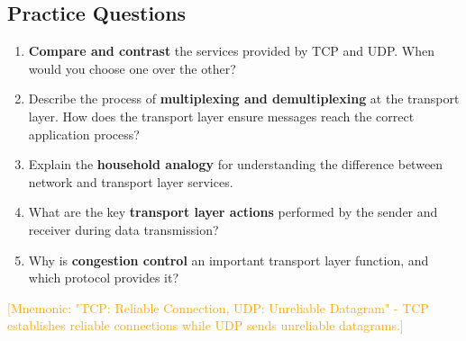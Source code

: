 \documentclass[12pt]{article}
\begin{document}
\subsection{Practice Questions}
\begin{enumerate}
    \item \textbf{Compare and contrast} the services provided by TCP and UDP. When would you choose one over the other?

    \item Describe the process of \textbf{multiplexing and demultiplexing} at the transport layer. How does the transport layer ensure messages reach the correct application process?

    \item Explain the \textbf{household analogy} for understanding the difference between network and transport layer services.

    \item What are the key \textbf{transport layer actions} performed by the sender and receiver during data transmission?

    \item Why is \textbf{congestion control} an important transport layer function, and which protocol provides it?
\end{enumerate}

\textcolor{orange}{[Mnemonic: "TCP: Reliable Connection, UDP: Unreliable Datagram" - TCP establishes reliable connections while UDP sends unreliable datagrams.]}
\end{document}
